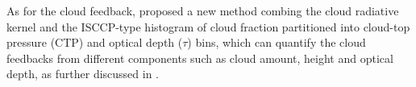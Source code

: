 

As for the cloud feedback, \cite{Zelinka2012computing1,Zelinka2012computing2} proposed a new method combing the cloud radiative kernel and the ISCCP-type histogram of cloud fraction partitioned into cloud-top pressure (CTP) and optical depth ($\tau$) bins, which can quantify the cloud feedbacks from different components such as cloud amount, height and optical depth, as further discussed in . %

